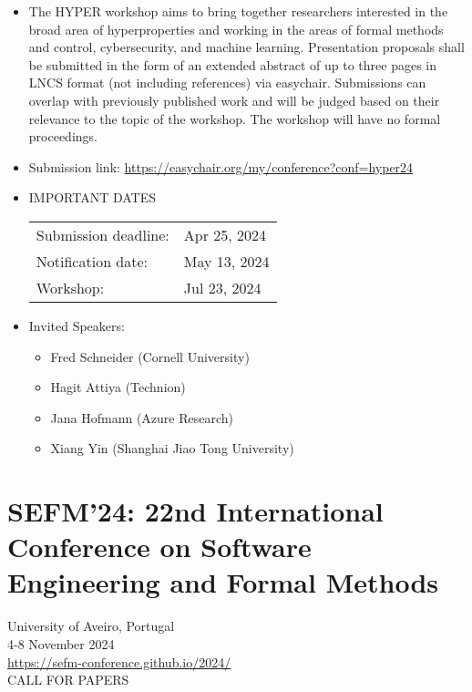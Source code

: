 \documentclass[prodmode,acmtecs]{acmsmall} %
\begin{document}
\begin{itemize}\item  The HYPER workshop aims to bring together researchers interested in the broad area of hyperproperties and working in the areas of formal methods and control, cybersecurity, and machine learning. Presentation proposals shall be submitted in the form of an extended abstract of up to three pages in LNCS format (not including references) via easychair. Submissions can overlap with previously published work and will be judged based on their relevance to the topic of the workshop. The workshop will have no formal proceedings. 
 
\item  Submission link: \href{https://easychair.org/my/conference?conf=hyper24}{https://easychair.org/my/conference?conf=hyper24} 
 
\item  IMPORTANT DATES  
 
\begin{tabulary}{\linewidth}{LL}Submission deadline:  & Apr 25, 2024 \\
Notification date:  & May 13, 2024 \\
Workshop:  & Jul 23, 2024 \\
\end{tabulary}
 
\item  Invited Speakers:  
 
\begin{itemize}\item  Fred Schneider (Cornell University)
\item  Hagit Attiya (Technion)
\item  Jana Hofmann (Azure Research)
\item  Xiang Yin (Shanghai Jiao Tong University)
\end{itemize} 
\end{itemize}\section{SEFM'24: 22nd International Conference on Software Engineering and Formal Methods}\label{SEFM24}  University of Aveiro, Portugal\\ 
  4-8 November 2024\\ 
  \href{https://sefm-conference.github.io/2024/}{https://sefm-conference.github.io/2024/}\\ 
CALL FOR PAPERS 
\end{document}
